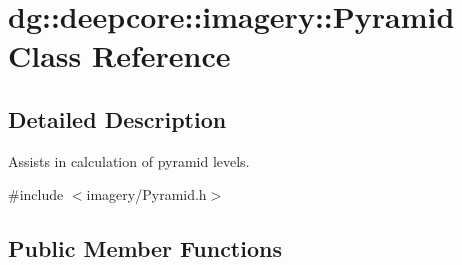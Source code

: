 \hypertarget{classdg_1_1deepcore_1_1imagery_1_1_pyramid}{}\section{dg\+:\+:deepcore\+:\+:imagery\+:\+:Pyramid Class Reference}
\label{classdg_1_1deepcore_1_1imagery_1_1_pyramid}


\subsection{Detailed Description}
Assists in calculation of pyramid levels. 

{\ttfamily \#include $<$imagery/\+Pyramid.\+h$>$}

\subsection*{Public Member Functions}
